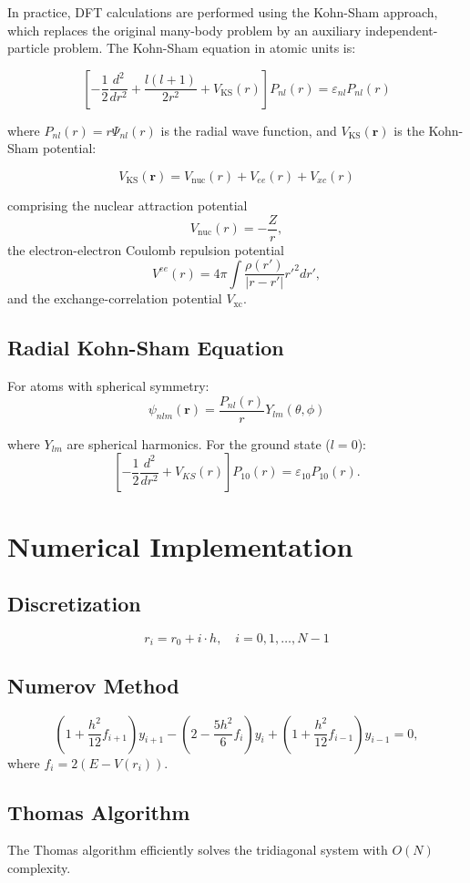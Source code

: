 \documentclass[12pt,a4paper]{article}
\begin{document}
In practice, DFT calculations are performed using the Kohn-Sham approach, which replaces the original many-body problem by an auxiliary independent-particle problem. The Kohn-Sham equation in atomic units is:

\[
\left[-\frac{1}{2}\frac{d^2}{dr^2} + \frac{l(l+1)}{2r^2}+V_\text{KS}(r)\right]P_{nl}(r) = \varepsilon_{nl}P_{nl}(r)
\]

where $P_{nl}(r)=r\Psi_{nl}(r)$ is the radial wave function, and $V_{\text{KS}}(\mathbf{r})$ is the Kohn-Sham potential:

\[
V_{\text{KS}}(\mathbf{r}) = V_\text{nuc}(r) + V_{ee}(r) + V_{xc}(r)
\]

comprising the nuclear attraction potential
\[
V_\text{nuc}(r)=-\frac{Z}{r},
\]
the electron-electron Coulomb repulsion potential
\[
V^{ee}(r) = 4\pi \int \frac{\rho(r')}{|r-r'|} r'^2 dr',
\]
and the exchange-correlation potential $V_{\text{xc}}$.

\subsection{Radial Kohn-Sham Equation}

For atoms with spherical symmetry:
\[
\psi_{nlm}(\mathbf{r}) = \frac{P_{nl}(r)}{r} Y_{lm}(\theta, \phi)
\]

where $Y_{lm}$ are spherical harmonics. For the ground state ($l=0$):
\[
\left[ -\frac{1}{2}\frac{d^2}{dr^2} + V_{{KS}}(r) \right] P_{10}(r) = \varepsilon_{10}P_{10}(r).
\]

\section{Numerical Implementation}

\subsection{Discretization}
\[
r_i = r_0 + i \cdot h, \quad i = 0,1,\dots,N-1
\]

\subsection{Numerov Method}
\[
(1 + \frac{h^2}{12} f_{i+1}) y_{i+1} - (2 - \frac{5h^2}{6} f_i) y_i + (1 + \frac{h^2}{12} f_{i-1}) y_{i-1} = 0,
\]
where $f_i = 2(E - V(r_i))$.

\subsection{Thomas Algorithm}
The Thomas algorithm efficiently solves the tridiagonal system with $O(N)$ complexity.
\end{document}
